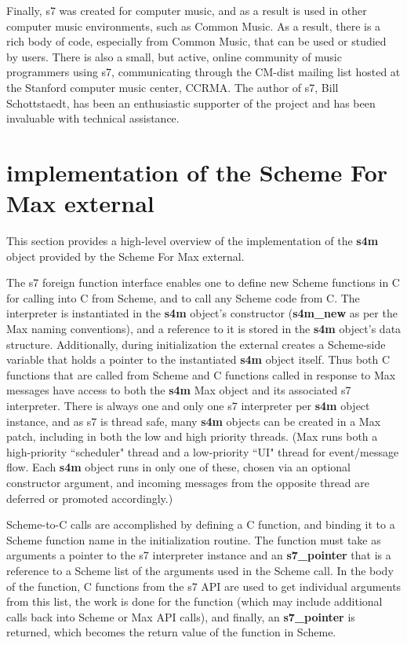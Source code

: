 \documentclass[acmsmall]{acmart}
\begin{document}
Finally, s7 was created for computer music, and as a result is used in other computer music
environments, such as Common Music. As a result, there is a rich body of code, especially
from Common Music, that can be used or studied by users. There is also a small, but active, 
online community of music programmers using s7, communicating through the CM-dist mailing
list hosted at the Stanford computer music center, CCRMA. The author of s7, Bill
Schottstaedt, has been an enthusiastic supporter of the project and has been invaluable
with technical assistance.  


\section{implementation of the Scheme For Max external}

This section provides a high-level overview of the implementation of the \textbf{s4m} 
object provided by the Scheme For Max external.

The s7 foreign function interface enables one to define new Scheme functions in C 
for calling into C from Scheme, and to call any Scheme code from C. 
The interpreter is instantiated
in the \textbf{s4m} object's constructor (\textbf{s4m\_new} as per the Max naming conventions), and
a reference to it is stored in the \textbf{s4m} object's data structure.
Additionally, during initialization the external creates a Scheme-side variable 
that holds a pointer to the instantiated \textbf{s4m} object itself. Thus
both C functions that are called from Scheme and C functions called in response to Max
messages have access to both the \textbf{s4m} Max object and its associated s7 interpreter.
There is always one and only one s7 interpreter per \textbf{s4m} object instance, and
as s7 is thread safe, many \textbf{s4m} objects can be created in a Max patch, including
in both the low and high priority threads. (Max runs both a high-priority ``scheduler" 
thread and a low-priority ``UI" thread for event/message flow. Each \textbf{s4m} object 
runs in only one of these, chosen via an optional constructor argument, and incoming messages
from the opposite thread are deferred or promoted accordingly.)

Scheme-to-C calls are accomplished by defining a C function, and binding
it to a Scheme function name in the initialization routine. 
The function must take as arguments a pointer to the s7 interpreter instance and an \textbf{s7\_pointer}
that is a reference to a Scheme list of the arguments used in the Scheme call.
In the body of the function, C functions from the s7 API are used to get 
individual arguments from this list, the work is done for the function 
(which may include additional calls back into Scheme or Max API calls),
and finally, an \textbf{s7\_pointer} is returned, which becomes the return value of the 
function in Scheme.
\end{document}
